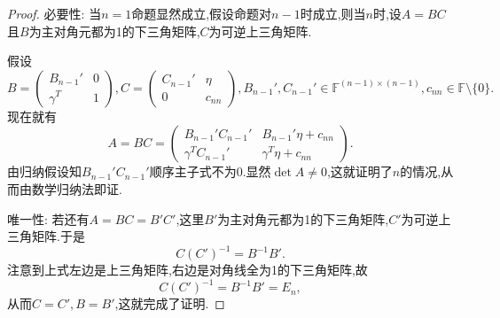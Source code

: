 \documentclass[../../main.tex]{subfiles}
\begin{document}
\begin{proof}
{\heiti 必要性:} 当\(n = 1\)命题显然成立,假设命题对\(n - 1\)时成立,则当\(n\)时,设\(A = BC\)且\(B\)为主对角元都为1的下三角矩阵,\(C\)为可逆上三角矩阵.

假设
\[
B = \begin{pmatrix}
B_{n - 1}' & 0 \\
\gamma^T & 1
\end{pmatrix}, C = \begin{pmatrix}
C_{n - 1}' & \eta \\
0 & c_{nn}
\end{pmatrix}, B_{n - 1}', C_{n - 1}' \in \mathbb{F}^{(n - 1) \times (n - 1)}, c_{nn} \in \mathbb{F} \setminus \{0\}.
\]
现在就有
\[
A = BC = \begin{pmatrix}
B_{n - 1}' C_{n - 1}' & B_{n - 1}' \eta + c_{nn} \\
\gamma^T C_{n - 1}' & \gamma^T \eta + c_{nn}
\end{pmatrix}.
\]
由归纳假设知\(B_{n - 1}' C_{n - 1}'\)顺序主子式不为0.显然\(\det A \neq 0\),这就证明了\(n\)的情况,从而由数学归纳法即证.

{\heiti 唯一性:} 若还有\(A = BC = B'C'\),这里\(B'\)为主对角元都为1的下三角矩阵,\(C'\)为可逆上三角矩阵.于是
\[
C (C')^{-1} = B^{-1} B'.
\]
注意到上式左边是上三角矩阵,右边是对角线全为1的下三角矩阵,故
\[
C (C')^{-1} = B^{-1} B' = E_n,
\]
从而\(C = C', B = B'\),这就完成了证明.

\end{proof}
\end{document}
